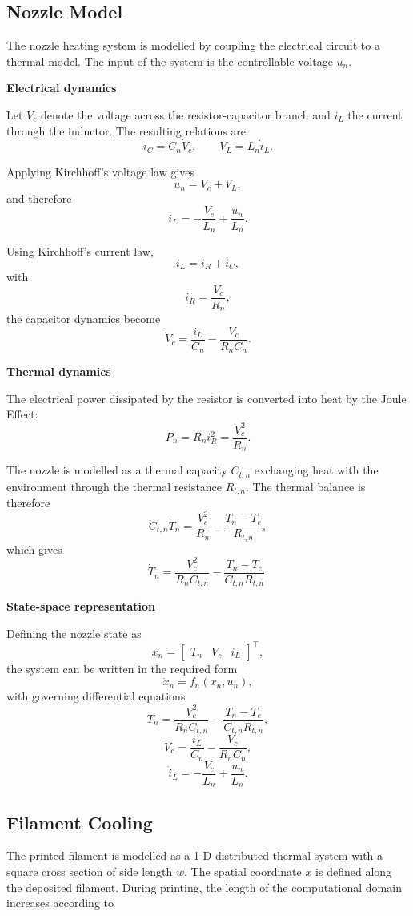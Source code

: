 \documentclass[11pt,a4paper]{article}
\begin{document}
\subsection{Nozzle Model}
The nozzle heating system is modelled by coupling the electrical circuit
to a thermal model. The input of the system is the controllable
voltage $u_n$.

\medskip
\noindent\textbf{Electrical dynamics}

Let $V_c$ denote the voltage across the resistor-capacitor branch and
$i_L$ the current through the inductor. The resulting relations are
\[
i_C=C_n\dot V_c,
\qquad
V_L=L_n\dot i_L.
\]

Applying Kirchhoff's voltage law gives
\[
u_n=V_c+V_L,
\]
and therefore
\[
\dot i_L
=
-\frac{V_c}{L_n}
+
\frac{u_n}{L_n}.
\]

Using Kirchhoff's current law,
\[
i_L=i_R+i_C,
\]
with
\[
i_R=\frac{V_c}{R_n},
\]
the capacitor dynamics become
\[
\dot V_c
=
\frac{i_L}{C_n}
-
\frac{V_c}{R_nC_n}.
\]

\medskip
\noindent\textbf{Thermal dynamics}

The electrical power dissipated by the resistor is converted into heat by the Joule Effect:
\[
P_n
=
R_ni_R^2
=
\frac{V_c^2}{R_n}.
\]

The nozzle is modelled as a thermal capacity $C_{t,n}$ exchanging
heat with the environment through the thermal resistance $R_{t,n}$. The
thermal balance is therefore
\[
C_{t,n}\dot T_n
=
\frac{V_c^2}{R_n}
-
\frac{T_n-T_e}{R_{t,n}},
\]
which gives
\[
\dot T_n
=
\frac{V_c^2}{R_nC_{t,n}}
-
\frac{T_n-T_e}{C_{t,n}R_{t,n}}.
\]

\medskip
\noindent\textbf{State-space representation}

Defining the nozzle state as
\[
x_n=
\begin{bmatrix}
T_n & V_c & i_L
\end{bmatrix}^{\top},
\]
the system can be written in the required form
\[
\dot{x}_n=f_n(x_n,u_n),
\]
with governing differential equations
\[
\dot T_n
=
\frac{V_c^2}{R_nC_{t,n}}
-
\frac{T_n-T_e}{C_{t,n}R_{t,n}},
\]
\[
\dot V_c
=
\frac{i_L}{C_n}
-
\frac{V_c}{R_nC_n},
\]
\[
\dot i_L
=
-\frac{V_c}{L_n}
+
\frac{u_n}{L_n}.
\]

\subsection{Filament Cooling}

The printed filament is modelled as a 1-D distributed thermal system with a square
cross section of side length $w$. The spatial coordinate $x$ is defined along the deposited
filament. During printing, the length of the computational domain increases according to
\end{document}
